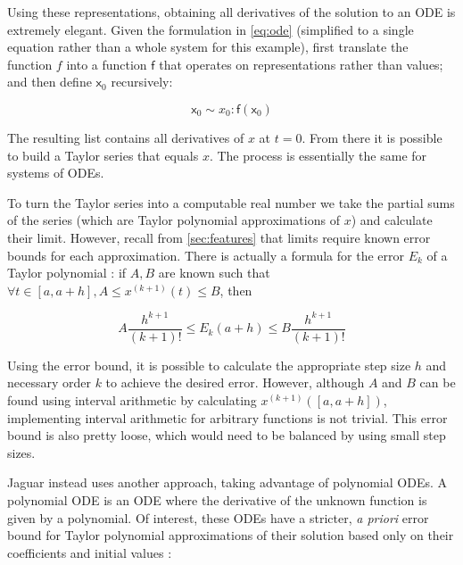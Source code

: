 Using these representations, obtaining all derivatives of the solution to an ODE is extremely elegant. Given the formulation in \cref{eq:ode} (simplified to a single equation rather than a whole system for this example), first translate the function $f$ into a function $\textsf{f}$ that operates on representations rather than values; and then define $\textsf{x}_0$ recursively:

\begin{equation*}
\textsf{x}_0 \sim x_0 : \textsf{f}(\textsf{x}_0)
\end{equation*}

The resulting list contains all derivatives of $x$ at $t=0$. From there it is possible to build a Taylor series that equals $x$. The process is essentially the same for systems of ODEs.

To turn the Taylor series into a computable real number we take the partial sums of the series (which are Taylor polynomial approximations of $x$) and calculate their limit. However, recall from \cref{sec:features} that limits require known error bounds for each approximation. There is actually a formula for the error $E_k$ of a Taylor polynomial \cite{apostol1991calculus}: if $A,B$ are known such that $\forall t \in [a,a + h], A \leq x^{(k+1)}(t) \leq B$, then

\begin{equation*}
   A\frac{h^{k+1}}{(k+1)!} \leq E_k(a+h) \leq B\frac{h^{k+1}}{(k+1)!}
\end{equation*}

Using the error bound, it is possible to calculate the appropriate step size $h$ and necessary order $k$ to achieve the desired error. However, although $A$ and $B$ can be found using interval arithmetic by calculating $x^{(k+1)}([a, a+h])$, implementing interval arithmetic for arbitrary functions is not trivial. This error bound is also pretty loose, which would need to be balanced by using small step sizes.

Jaguar instead uses another approach, taking advantage of polynomial ODEs. A polynomial ODE is an ODE where the derivative of the unknown function is given by a polynomial. Of interest, these ODEs have a stricter, \textit{a priori} error bound for Taylor polynomial approximations of their solution based only on their coefficients and initial values \cite{WARNE20061695}:

